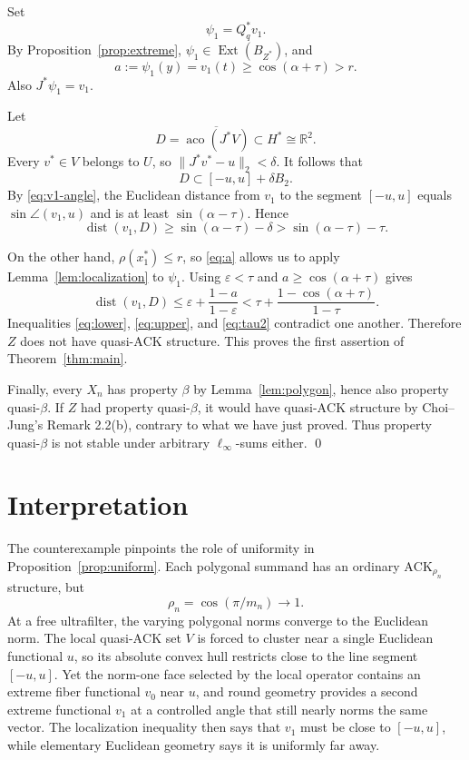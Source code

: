 \documentclass[11pt]{article}
\theoremstyle{definition}
\newcommand{\R}{\mathbb R}
\newcommand{\Ext}{\operatorname{Ext}}
\newcommand{\aco}{\operatorname{aco}}
\newcommand{\dist}{\operatorname{dist}}
\newcommand{\eps}{\varepsilon}
\newcommand{\ACK}{\mathrm{ACK}}
\begin{document}
Set
\[
  \psi_1=Q_q^*v_1.
\]
By Proposition~\ref{prop:extreme}, $\psi_1\in\Ext(B_{Z^*})$, and
\begin{equation}\label{eq:a}
  a:=\psi_1(y)=v_1(t)\ge\cos(\alpha+\tau)>r.
\end{equation}
Also $J^*\psi_1=v_1$.

Let
\[
  D=\overline{\aco(J^*V)}\subset H^*\cong\R^2.
\]
Every $v^*\in V$ belongs to $U$, so
$\|J^*v^*-u\|_2<\delta$.  It follows that
\begin{equation}\label{eq:D-tube}
  D\subset[-u,u]+\delta B_2.
\end{equation}
By \eqref{eq:v1-angle}, the Euclidean distance from $v_1$ to the segment
$[-u,u]$ equals $\sin\angle(v_1,u)$ and is at least
$\sin(\alpha-\tau)$.  Hence
\begin{equation}\label{eq:lower}
  \dist(v_1,D)
  \ge\sin(\alpha-\tau)-\delta
  >\sin(\alpha-\tau)-\tau.
\end{equation}

On the other hand, $\rho(x_1^*)\le r$, so \eqref{eq:a} allows us to apply
Lemma~\ref{lem:localization} to $\psi_1$.  Using $\eps<\tau$ and
$a\ge\cos(\alpha+\tau)$ gives
\begin{equation}\label{eq:upper}
 \dist(v_1,D)
 \le\eps+\frac{1-a}{1-\eps}
 <\tau+\frac{1-\cos(\alpha+\tau)}{1-\tau}.
\end{equation}
Inequalities \eqref{eq:lower}, \eqref{eq:upper}, and \eqref{eq:tau2}
contradict one another.  Therefore $Z$ does not have quasi-$\ACK$ structure.
This proves the first assertion of Theorem~\ref{thm:main}.

Finally, every $X_n$ has property $\beta$ by Lemma~\ref{lem:polygon}, hence also
property quasi-$\beta$.  If $Z$ had property quasi-$\beta$, it would have
quasi-$\ACK$ structure by Choi--Jung's Remark 2.2(b), contrary to what we
have just proved.  Thus property quasi-$\beta$ is not stable under arbitrary
$\ell_\infty$-sums either.  \qed

\section{Interpretation}

The counterexample pinpoints the role of uniformity in
Proposition~\ref{prop:uniform}.  Each polygonal summand has an ordinary
$\ACK_{\rho_n}$ structure, but
\[
  \rho_n=\cos(\pi/m_n)\longrightarrow1.
\]
At a free ultrafilter, the varying polygonal norms converge to the Euclidean
norm.  The local quasi-$\ACK$ set $V$ is forced to cluster near a single
Euclidean functional $u$, so its absolute convex hull restricts close to the
line segment $[-u,u]$.  Yet the norm-one face selected by the local operator
contains an extreme fiber functional $v_0$ near $u$, and round geometry
provides a second extreme functional $v_1$ at a controlled angle that still
nearly norms the same vector.  The localization inequality then says that
$v_1$ must be close to $[-u,u]$, while elementary Euclidean geometry says it
is uniformly far away.
\end{document}
